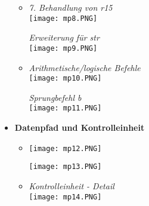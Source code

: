 \begin{itemize}
\begin{itemize}
\begin{minipage}{0.5\textwidth}
                    \end{minipage}
                \item[]
                    \begin{minipage}{0.4\textwidth}
                        \textit{7. Behandlung von r15} \\
                        \texttt{[image: mp8.PNG]}
                    \end{minipage}
                    \begin{minipage}{0.5\textwidth}
                        \textit{Erweiterung für str} \\
                        \texttt{[image: mp9.PNG]}
                    \end{minipage}
                \item[]
                    \begin{minipage}{0.4\textwidth}
                        \textit{Arithmetische/logische Befehle} \\
                        \texttt{[image: mp10.PNG]}
                    \end{minipage}
                    \begin{minipage}{0.5\textwidth}
                        \textit{Sprungbefehl b} \\
                        \texttt{[image: mp11.PNG]}
                    \end{minipage}
            \end{itemize}
\pagebreak
        \item \textbf{Datenpfad und Kontrolleinheit}
            \begin{itemize}
                \item[]
                    \begin{minipage}{0.6\textwidth}
                        \texttt{[image: mp12.PNG]}
                    \end{minipage}
                    \begin{minipage}{0.3\textwidth}
                        \texttt{[image: mp13.PNG]}
                    \end{minipage}
                \item[]
                    \begin{minipage}{0.45\textwidth}
                        \textit{Kontrolleinheit - Detail} \\
                        \texttt{[image: mp14.PNG]}
                    \end{minipage}
            \end{itemize}


\end{itemize}
